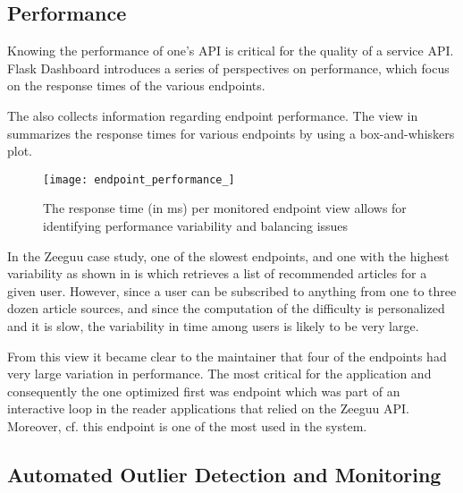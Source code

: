 
\subsection{Performance}
\label{sec:perf}

Knowing the performance of one’s API is critical for the quality of a service API. Flask Dashboard introduces a series of perspectives on performance, which focus on the response times of the various endpoints.





The \tool also collects information regarding endpoint performance. The view in  summarizes the response times for various endpoints by using a box-and-whiskers plot. 


 \begin{figure}[!ht]
   \centering
   \texttt{[image: endpoint\_performance\_]}
   \caption{The response time (in ms) per monitored endpoint view allows for identifying performance variability and balancing issues}
   \label{fig:ep}
 \end{figure}



In the Zeeguu case study, one of the slowest endpoints, and one with the highest variability as shown in  is \epFeedItemsColor which retrieves a list of recommended articles for a given user. However, since a user can be subscribed to anything from one to three dozen article sources, and since the computation of the difficulty is personalized and it is slow, the variability in time among users is likely to be very large. 

From this view it became clear to the maintainer that four of the endpoints had very large variation in performance.   The most critical for the application and consequently the one optimized first was \epTranslationsColor endpoint which was part of an interactive loop in the reader applications that relied on the Zeeguu API. Moreover, cf.  this endpoint is one of the most used in the system.



  \subsection{Automated Outlier Detection and Monitoring}
  
